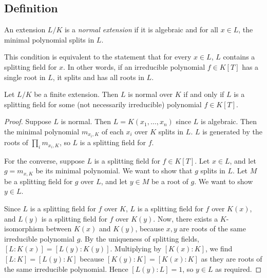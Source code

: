 \subsection{Definition}
\begin{definition}
	An extension \( L / K \) is a \emph{normal extension} if it is algebraic and for all \( x \in L \), the minimal polynomial splits in \( L \).
\end{definition}
\begin{remark}
	This condition is equivalent to the statement that for every \( x \in L \), \( L \) contains a splitting field for \( x \).
	In other words, if an irreducible polynomial \( f \in K[T] \) has a single root in \( L \), it splits and has all roots in \( L \).
\end{remark}
\begin{theorem}
	Let \( L / K \) be a finite extension.
	Then \( L \) is normal over \( K \) if and only if \( L \) is a splitting field for some (not necessarily irreducible) polynomial \( f \in K[T] \).
\end{theorem}
\begin{proof}
	Suppose \( L \) is normal.
	Then \( L = K(x_1, \dots, x_n) \) since \( L \) is algebraic.
	Then the minimal polynomial \( m_{x_i,K} \) of each \( x_i \) over \( K \) splits in \( L \).
	\( L \) is generated by the roots of \( \prod_i m_{x_i,K} \), so \( L \) is a splitting field for \( f \).

	For the converse, suppose \( L \) is a splitting field for \( f \in K[T] \).
	Let \( x \in L \), and let \( g = m_{x,K} \) be its minimal polynomial.
	We want to show that \( g \) splits in \( L \).
	Let \( M \) be a splitting field for \( g \) over \( L \), and let \( y \in M \) be a root of \( g \).
	We want to show \( y \in L \).
	
	Since \( L \) is a splitting field for \( f \) over \( K \), \( L \) is a splitting field for \( f \) over \( K(x) \), and \( L(y) \) is a splitting field for \( f \) over \( K(y) \).
	Now, there exists a \( K \)-isomorphism between \( K(x) \) and \( K(y) \), because \( x, y \) are roots of the same irreducible polynomial \( g \).
	By the uniqueness of splitting fields, \( [L:K(x)] = [L(y):K(y)] \).
	Multiplying by \( [K(x):K] \), we find \( [L:K] = [L(y):K] \) because \( [K(y):K] = [K(x):K] \) as they are roots of the same irreducible polynomial.
	Hence \( [L(y):L] = 1 \), so \( y \in L \) as required.
\end{proof}
